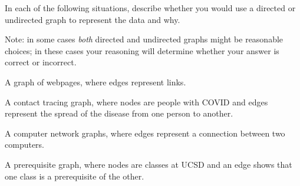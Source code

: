 \begin{prob}[\eligible]
    In each of the following situations, describe whether you would use a directed
    or undirected graph to represent the data and why.

    Note: in some cases \emph{both} directed and undirected graphs might be reasonable
    choices; in these cases your reasoning will determine whether your answer is correct
    or incorrect.

    \begin{subprobset}
        \begin{subprob}
            A graph of webpages, where edges represent links.
        \end{subprob}

        \begin{subprob}
            A contact tracing graph, where nodes are people with COVID and edges represent
            the spread of the disease from one person to another.
        \end{subprob}

        \begin{subprob}
            A computer network graphs, where edges represent a connection between two
            computers.
        \end{subprob}

        \begin{subprob}
            A prerequisite graph, where nodes are classes at UCSD and an edge shows
            that one class is a prerequisite of the other.
        \end{subprob}

    \end{subprobset}
\end{prob}
